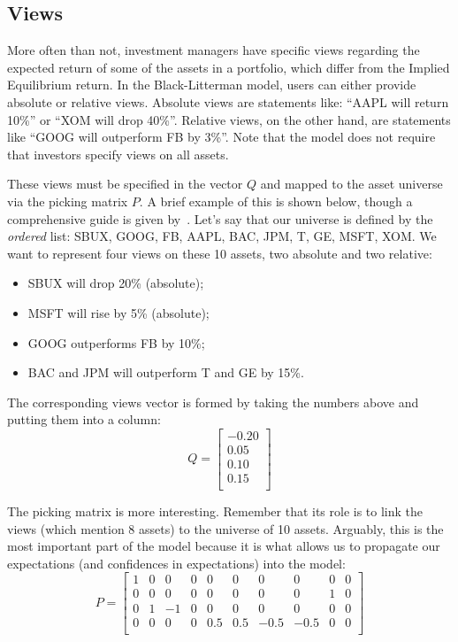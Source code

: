 \subsection{Views}
More often than not, investment managers have specific views regarding the expected return of some of the assets in a portfolio, which differ from the Implied Equilibrium return. 
In the Black-Litterman model, users can either provide absolute or relative views. Absolute views are statements like: “AAPL will return 10\%” or “XOM will drop 40\%”. Relative views, on the other hand, are statements like “GOOG will outperform FB by 3\%”.
Note that the model does not require that investors specify views on all assets.

These views must be specified in the vector $Q$ and mapped to the asset universe via the picking matrix $P$. A brief example of this is shown below, though a comprehensive guide is given by~\cite{bib:Idzorek}.
Let’s say that our universe is defined by the \emph{ordered} list: SBUX, GOOG, FB, AAPL, BAC, JPM, T, GE, MSFT, XOM. We want to represent four views on these 10 assets, two absolute and two relative:
\begin{itemize}
\item SBUX will drop 20\% (absolute);
\item MSFT will rise by 5\% (absolute);
\item GOOG outperforms FB by 10\%;
\item BAC and JPM will outperform T and GE by 15\%.
\end{itemize}

The corresponding views vector is formed by taking the numbers above and putting them into a column:
\begin{equation}
Q = \begin{bmatrix}-0.20 \\ 0.05\\ 0.10\\ 0.15\\\end{bmatrix}
\end{equation}

The picking matrix is more interesting. Remember that its role is to link the views (which mention 8 assets) to the universe of 10 assets. Arguably, this is the most important part of the model because it is what allows us to propagate our expectations (and confidences in expectations) into the model:
\begin{equation}
P = \begin{bmatrix}
1 & 0 & 0 & 0 & 0 & 0 & 0 & 0 & 0 & 0 \\
0 & 0 & 0 & 0 & 0 & 0 & 0 & 0 & 1 & 0 \\
0 & 1 & -1 & 0 & 0 & 0 & 0 & 0 & 0 & 0 \\
0 & 0 & 0 & 0 & 0.5 & 0.5 & -0.5 & -0.5 & 0 & 0 \\
\end{bmatrix}
\end{equation}

